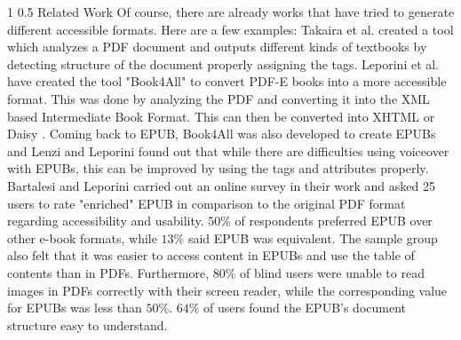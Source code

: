 \documentclass{llncs}
\makeatletter
\renewcommand\section{\@startsection 
   {section}{1}{0mm}%
   {1\baselineskip}%
   {0.5\baselineskip}%
   {\bfseries\Large}%
   }
\makeatother
\begin{document}
\section{Related Work}
Of course, there are already works that have tried to generate different accessible formats. Here are a few examples: 
Takaira et al. \cite{unified} created a tool which analyzes a PDF document and outputs different kinds of textbooks by detecting structure of the document properly assigning the tags.
Leporini et al. \cite{book4all} have created the tool "Book4All" to convert PDF-E books into a more accessible format. This was done by analyzing the PDF and converting it into the XML based Intermediate Book Format. This can then be converted into XHTML or Daisy \cite{daisyAccessibility}. 
Coming back to EPUB, Book4All was also developed to create EPUBs and Lenzi and Leporini \cite{voiceover} found out that while there are difficulties using voiceover with EPUBs, this can be improved by using the tags and attributes properly. 
Bartalesi and Leporini \cite{enrichEPUB} carried out an online survey in their work and asked 25 users to rate "enriched" EPUB in comparison to the original PDF format regarding accessibility and usability. $50\%$ of respondents preferred EPUB over other e-book formats, while $13\%$ said EPUB was equivalent.
The sample group also felt that it was easier to access content in EPUBs and use the table of contents than in PDFs.
Furthermore, $80\%$ of blind users were unable to read images in PDFs correctly with their screen reader, while the corresponding value for EPUBs was less than $50\%$. $64\%$ of users found the EPUB's document structure easy to understand. 
\end{document}
